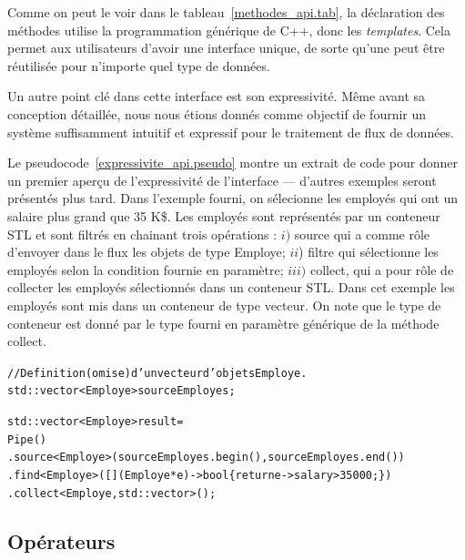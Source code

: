 Comme on peut le voir dans le tableau~\ref{methodes_api.tab}, la d\'eclaration des m\'ethodes utilise la programmation g\'en\'erique de C++, donc les \emph{templates}. Cela permet aux utilisateurs d'avoir une interface unique, de sorte qu'une peut \^etre r\'eutilis\'ee pour n'importe quel type de donn\'ees.


Un autre point cl\'e dans cette interface est son expressivit\'e. M\^eme avant sa conception d\'etaill\'ee, nous nous \'etions donn\'es comme objectif de fournir un syst\`eme suffisamment intuitif et expressif pour le traitement de flux de donn\'ees. 

Le pseudocode~\ref{expressivite_api.pseudo} montre un extrait de code pour donner un premier aper\c{c}u de l'expressivit\'e de l'interface --- d'autres exemples seront pr\'esent\'es plus tard. Dans l'exemple fourni, on s\'elecionne les employ\'es qui ont un salaire plus grand que 35 K\$. Les employ\'es sont repr\'esent\'es par un conteneur STL et sont filtr\'es en chainant trois op\'erations : $i)$ source qui a comme r\^ole d'envoyer dans le flux les objets de type Employe; $ii$) filtre qui s\'electionne les employ\'es selon la condition fournie en param\`etre; $iii)$ collect, qui a pour r\^ole de collecter les employ\'es s\'electionn\'es dans un conteneur STL. Dans cet exemple les employ\'es sont mis dans un conteneur de type vecteur. On note que le type de conteneur est donn\'e par le type fourni en param\`etre g\'en\'erique de la m\'ethode collect.


\begin{pseudocode}
{\samepage\small
\begin{alltt}
// Definition (omise) d'un vecteur d'objets Employe.
std::vector<Employe> sourceEmployes;

std::vector<Employe> result = 
        Pipe()
        .source<Employe>(sourceEmployes.begin(), sourceEmployes.end())
        .find<Employe>([](Employe *e) ->bool \{ return e->salary > 35000; \})
        .collect<Employe, std::vector>();

\end{alltt}
}
\caption{Un exemple illustrant l'\'expressivit\'e de l'API de \ppff.}
\label{expressivite_api.pseudo}
\end{pseudocode}




\subsection{Op\'erateurs}

